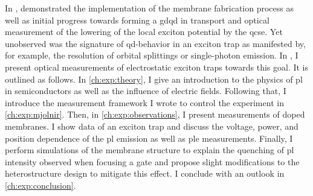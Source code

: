 In , \citeauthor{Descamps2023} demonstrated the implementation of the membrane fabrication process as well as initial progress towards forming a \gls{gdqd} in transport and optical measurement of the lowering of the local exciton potential by the \gls{qcse}.
Yet unobserved was the signature of \gls{qd}-behavior in an exciton trap as manifested by, for example, the resolution of orbital splittings or single-photon emission.
In \thispart, I present optical measurements of electrostatic exciton traps towards this goal.
It is outlined as follows.
In \cref{ch:exp:theory}, I give an introduction to the physics of \gls{pl} in semiconductors as well as the influence of electric fields.
Following that, I introduce the \python measurement framework I wrote to control the experiment in \cref{ch:exp:mjolnir}.
Then, in \cref{ch:exp:observations}, I present measurements of doped membranes.
I show data of an exciton trap and discuss the voltage, power, and position dependence of the \gls{pl} emission as well as \gls{ple} measurements.
Finally, I perform simulations of the membrane structure to explain the quenching of \gls{pl} intensity observed when focusing a gate and propose slight modifications to the heterostructure design to mitigate this effect.
I conclude with an outlook in \cref{ch:exp:conclusion}.